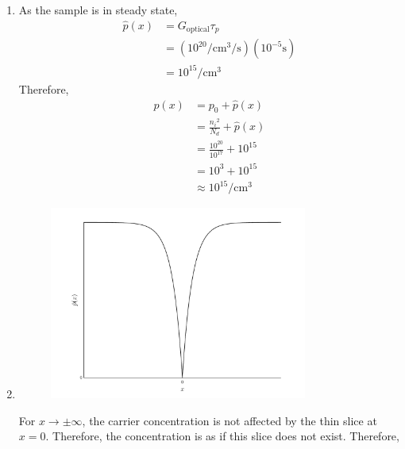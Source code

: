 \documentclass[fleqn, a4paper, 11pt, oneside]{amsart}
\theoremstyle{definition}
\theoremstyle{theorem}
\begin{document}
\begin{solution}
	\begin{enumerate}[leftmargin=*]
		\item
			As the sample is in steady state,
			\begin{align*}
				\hat{p}(x) & = G_{\text{optical}} \tau_p                                                                         \\
                                           & = \left( 10^{20} \si{\per\centi\metre\cubed\per\second} \right) \left( 10^{-5} \si{\second} \right) \\
                                           & = 10^{15} \si{\per\centi\metre\cubed}
			\end{align*}
			Therefore,
			\begin{align*}
				p(x) & = p_0 + \hat{p}(x)                  \\
                                     & = \frac{{n_i}^2}{N_d} + \hat{p}(x)  \\
                                     & = \frac{10^{20}}{10^{17}} + 10^{15} \\
                                     & = 10^3 + 10^{15}                    \\
                                     & \approx 10^{15} \si{\per\centi\metre\cubed}
			\end{align*}
		\item
			\begin{figure}[H]
				\centering
				\includegraphics[width = 0.8\textwidth]{plot1.pdf}
			\end{figure}
			For $x \to \pm\infty$, the carrier concentration is not affected by the thin slice at $x = 0$.
			Therefore, the concentration is as if this slice does not exist.
			Therefore,
			\begin{align*}

\end{align*}
\end{enumerate}
\end{solution}
\end{document}
